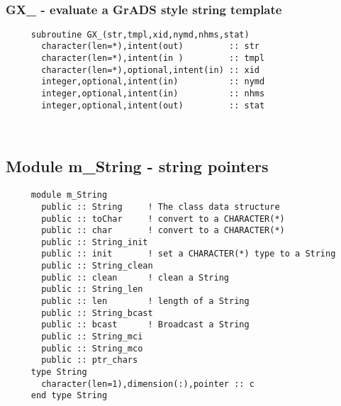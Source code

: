  
\mbox{}\hrulefill\ 

  \subsubsection{GX\_ - evaluate a GrADS style string template}

\begin{verbatim} 
     subroutine GX_(str,tmpl,xid,nymd,nhms,stat)
       character(len=*),intent(out)         :: str
       character(len=*),intent(in )         :: tmpl
       character(len=*),optional,intent(in) :: xid
       integer,optional,intent(in)          :: nymd
       integer,optional,intent(in)          :: nhms
       integer,optional,intent(out)         :: stat
 \end{verbatim}%

 
 
\mbox{}\hrulefill\ 
 
  \subsection{Module m\_String - string pointers }

\begin{verbatim} 
     module m_String
       public :: String		! The class data structure
       public :: toChar		! convert to a CHARACTER(*)
       public :: char		! convert to a CHARACTER(*)
       public :: String_init
       public :: init		! set a CHARACTER(*) type to a String
       public :: String_clean
       public :: clean		! clean a String
       public :: String_len
       public :: len		! length of a String 
       public :: String_bcast
       public :: bcast		! Broadcast a String 
       public :: String_mci
       public :: String_mco
       public :: ptr_chars
     type String
       character(len=1),dimension(:),pointer :: c
     end type String
 \end{verbatim}%
 
